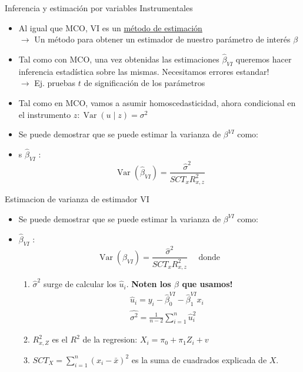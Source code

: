 \documentclass[10pt]{beamer}
\begin{document}
\begin{frame}{Inferencia y estimación por variables Instrumentales}
    \begin{itemize}
        \item Al igual que MCO, VI es un \underline{método de estimación}\\
        $\rightarrow$ Un método para obtener un estimador de nuestro parámetro de interés $\beta$
        \item Tal como con MCO, una vez obtenidas las estimaciones $\hat{\beta}_{V I}$ queremos hacer inferencia estadística sobre las mismas. Necesitamos errores estandar!\\
        $\rightarrow$ Ej. pruebas $t$ de significación de los parámetros
        \item Tal como en MCO, vamos a asumir homoscedasticidad, ahora condicional en el instrumento $z: \operatorname{Var}(u \mid z)=\sigma^{2}$
        \item Se puede demostrar que se puede estimar la varianza de $\beta^{V I}$ como:
        \item s $\hat{\beta}_{V I}$ :
        $$
        \operatorname{Var}\left(\hat{\beta}_{V I}\right)=\frac{\hat{\sigma}^{2}}{S C T_{x} R_{x, z}^{2}}
        $$
    \end{itemize}
\end{frame}

\begin{frame}{Estimacion de varianza de estimador VI}
    \begin{itemize}
        \item Se puede demostrar que se puede estimar la varianza de $\beta^{V I}$ como:
        \item $\hat{\beta}_{V I}$ :
        $$
        \operatorname{Var}\left(\hat{\beta}_{V I}\right)=\frac{\hat{\sigma}^{2}}{S C T_{x} R_{x, z}^{2}} \quad \text { donde }
        $$
        \begin{enumerate}
            \item $\hat{\sigma}^{2}$ surge de calcular los $\hat{u}_{i}$. \textbf{Noten los $\beta$ que usamos!}
            $$
            \begin{gathered}
            \hat{u}_{i}=y_{i}-\hat{\beta}^{VI}_0-\hat{\beta}^{VI}_{1} x_{i} \\
            \hat{\sigma^{2}}=\frac{1}{n-2} \sum_{i=1}^{n} \hat{u}_{i}^{2}
            \end{gathered}
            $$
            \item $R_{x, Z}^{2}$ es el $R^{2}$ de la regresion: $X_{i}=\pi_{0}+\pi_{1} Z_{i}+v$
            \item $S C T_{X}=\sum_{i=1}^{n}\left(x_{i}-\bar{x}\right)^{2}$ es la suma de cuadrados explicada de $X$.
        \end{enumerate}
    \end{itemize}
\end{frame}
\end{document}

